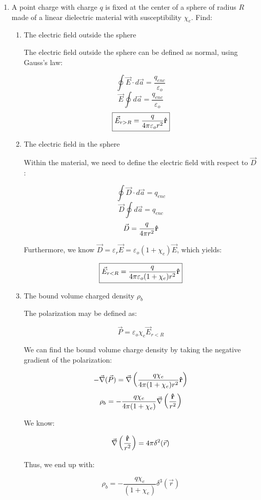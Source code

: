 \begin{enumerate}
  \item A point charge with charge $q$ is fixed at the center of a sphere of radius $R$ made of a linear dielectric material with susceptibility $\chi_e$. Find:

    \begin{enumerate}

      \item The electric field outside the sphere

        The electric field outside the sphere can be defined as normal, using Gauss's law:

        $$\oint \vec{E}\cdot d\vec{a}=\frac{q_{enc}}{\varepsilon_o}$$
        $$\vec{E}\oint d\vec{a}=\frac{q_{enc}}{\varepsilon_o}$$
        $$\boxed{\vec{E}_{r>R}=\frac{q}{4\pi\varepsilon_o r^2}\bold{\hat{r}}}$$

      \item The electric field in the sphere

        Within the material, we need to define the electric field with respect to $\vec{D}$:

        $$\oint \vec{D}\cdot d\vec{a}=q_{enc}$$
        $$\vec{D}\oint d\vec{a}=q_{enc}$$
        $$\vec{D}=\frac{q}{4\pi r^2}\bold{\hat{r}}$$

        Furthermore, we know $\vec{D}=\varepsilon_r\vec{E}=\varepsilon_o(1+\chi_e)\vec{E}$, which yields:

        $$\boxed{\vec{E}_{r<R}=\frac{q}{4\pi\varepsilon_o(1+\chi_e)r^2}\bold{\hat{r}}}$$

      \item The bound volume charged density $\rho_b$

        The polarization may be defined as:

        $$\vec{P}=\varepsilon_o\chi_e\vec{E}_{r<R}$$

        We can find the bound volume charge density by taking the negative gradient of the polarization:

        $$-\vec{\nabla}(\vec{P})=\vec{\nabla}\left( \frac{q\chi_e}{4\pi(1+\chi_e)r^2}\bold{\hat{r}} \right)$$
        $$\rho_b=-\frac{q\chi_e}{4\pi(1+\chi_e)}\vec{\nabla}\left( \frac{\bold{\hat{r}}}{r^2} \right)$$

        We know:

        $$\vec{\nabla}\left( \frac{\bold{\hat{r}}}{r^2} \right)=4\pi\delta^2(\vec{r})$$

        Thus, we end up with:

        $$\boxed{\rho_b=-\frac{q\chi_e}{(1+\chi_e)}\delta^3(\vec{r})}$$


\end{enumerate}
\end{enumerate}
